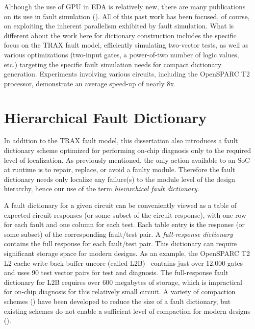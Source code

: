 Although the use of GPU in EDA is relatively new, there are many publications on its use in fault simulation (\cite{gulati09, parkes95, li10, kochte10, huaweili10, gulati08, chatterjee09}).
%
All of this past work has been focused, of course, on exploiting the inherent parallelism exhibited by fault simulation.
%
What is different about the work here for dictionary construction includes the specific focus on the TRAX fault model, efficiently simulating two-vector tests, as well as various optimizations (two-input gates, a power-of-two number of logic values, etc.) targeting the specific fault simulation needs for compact dictionary generation.
%
Experiments involving various circuits, including the OpenSPARC T2 processor, demonstrate an average speed-up of nearly 8x.


\section{Hierarchical Fault Dictionary}
\label{sec:intro_dict}

In addition to the TRAX fault model, this dissertation also introduces a fault dictionary scheme optimized for performing on-chip diagnosis only to the required level of localization.
%
As previously mentioned, the only action available to an SoC at runtime is to repair, replace, or avoid a faulty module.
%
Therefore the fault dictionary needs only localize any failure(s) to the module level of the design hierarchy, hence our use of the term \textit{hierarchical fault dictionary}.

A fault dictionary for a given circuit can be conveniently viewed as a table of expected circuit responses (or some subset of the circuit response), with one row for each fault and one column for each test.
%
Each table entry is the response (or some subset) of the corresponding fault/test pair.
%
A \textit{full-response dictionary} contains the full response for each fault/test pair.
%
This dictionary can require significant storage space for modern designs.
%
As an example, the OpenSPARC T2 L2 cache write-back buffer uncore (called L2B)~\cite{sun11} contains just over 12,000 gates and uses 90 test vector pairs for test and diagnosis.
%
The full-response fault dictionary for L2B requires over 600 megabytes of storage, which is impractical for on-chip diagnosis for this relatively small circuit.
%
A variety of compaction schemes (\cite{arslan02, bernardi06, boppana94, chakravarty99, boppana96, chess99, hong07, pomeranz92}) have been developed to reduce the size of a fault dictionary, but existing schemes do not enable a sufficient level of compaction for modern designs (\cite{ryan93, boppana94}).

